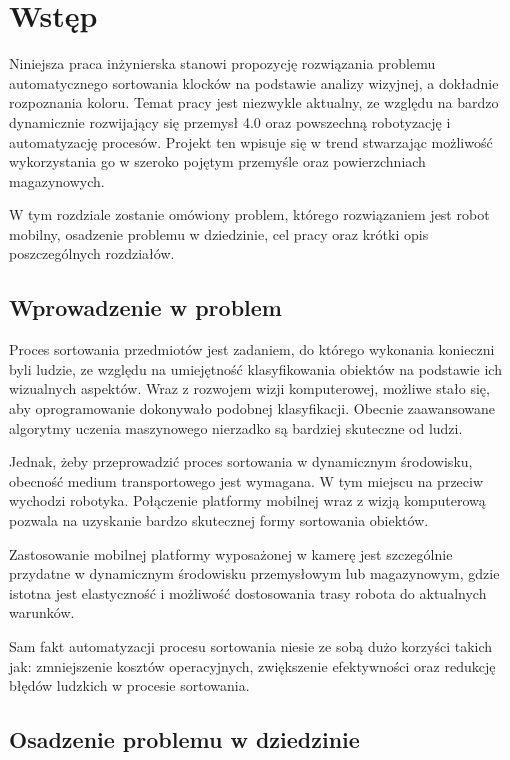 \chapter{Wstęp}
\label{ch:wstep}

Niniejsza praca inżynierska stanowi propozycję rozwiązania problemu automatycznego sortowania klocków na podstawie analizy wizyjnej, a dokładnie rozpoznania koloru. Temat pracy jest niezwykle aktualny, ze względu na bardzo dynamicznie rozwijający się przemysł 4.0 oraz powszechną robotyzację i automatyzację procesów. Projekt ten wpisuje się w trend stwarzając możliwość wykorzystania go w szeroko pojętym przemyśle oraz powierzchniach magazynowych. 

W tym rozdziale zostanie omówiony problem, którego rozwiązaniem jest robot mobilny, osadzenie problemu w dziedzinie, cel pracy oraz krótki opis poszczególnych rozdziałów. 

\section{Wprowadzenie w problem}
\label{sec:wprowadzenie}

Proces sortowania przedmiotów jest zadaniem, do którego wykonania konieczni byli ludzie, ze względu na umiejętność klasyfikowania obiektów na podstawie ich wizualnych aspektów. Wraz z rozwojem wizji komputerowej, możliwe stało się, aby oprogramowanie dokonywało podobnej klasyfikacji. Obecnie zaawansowane algorytmy uczenia maszynowego nierzadko są bardziej skuteczne od ludzi. 

Jednak, żeby przeprowadzić proces sortowania w dynamicznym środowisku, obecność medium transportowego jest wymagana. W tym miejscu na przeciw wychodzi robotyka. Połączenie platformy mobilnej wraz z wizją komputerową pozwala na uzyskanie bardzo skutecznej formy sortowania obiektów. 

Zastosowanie mobilnej platformy wyposażonej w kamerę jest szczególnie przydatne w dynamicznym środowisku przemysłowym lub magazynowym, gdzie istotna jest elastyczność i możliwość dostosowania trasy robota do aktualnych warunków. 

Sam fakt automatyzacji procesu sortowania niesie ze sobą dużo korzyści takich jak: zmniejszenie kosztów operacyjnych, zwiększenie efektywności oraz redukcję błędów ludzkich w procesie sortowania.  

\section{Osadzenie problemu w dziedzinie}
\label{sec:osadzenie}

